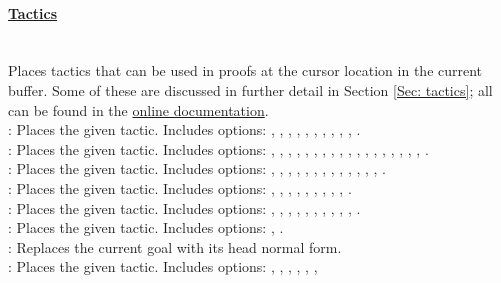 \paragraph{\underline{Tactics}}
~\\
Places tactics that can be used in proofs at the cursor location in the current buffer. 
Some of these are discussed in further detail in Section \ref{Sec: tactics}; 
all can be found in the \href{https://coq.inria.fr/distrib/V8.10.2/refman/coq-tacindex.html}{online documentation}. 
~\\
 : Places the given tactic. Includes options: 
	, , , , , , 
	, , , , . 
\\
 : Places the given tactic. Includes options: 
	, , , , , , , 
	, , , , , , , 
	, , , , . 
\\
 : Places the given tactic. Includes options: 
	, , , , 
	, , , 
	, , , 
	, , , . 
\\
 : Places the given tactic. Includes options: 
	, , , , , , 
	, , , . 
\\
 : Places the given tactic. Includes options: 
	, , , , , , 
	, , , , . 
\\
 : Places the given tactic. Includes options: 
	, . 
\\
 : Replaces the current goal with its head normal form. 
\\
 : Places the given tactic. Includes options: 
	, , , , , , 
